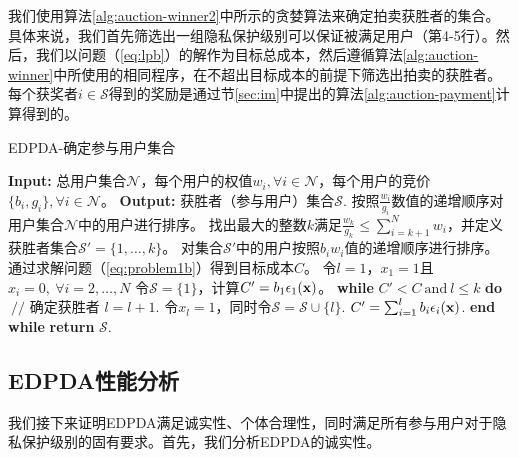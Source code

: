 	我们使用算法\ref{alg:auction-winner2}中所示的贪婪算法来确定拍卖获胜者的集合。具体来说，我们首先筛选出一组隐私保护级别可以保证被满足用户（第4-5行）。然后，我们以问题（\ref{eq:lpb}）的解作为目标总成本，然后遵循算法\ref{alg:auction-winner}中所使用的相同程序，在不超出目标成本的前提下筛选出拍卖的获胜者。每个获奖者$i\in\mathcal{S}$得到的奖励是通过节\ref{sec:im}中提出的算法\ref{alg:auction-payment}计算得到的。
	
	\begin{algorithm}
		\caption{EDPDA-确定参与用户集合}
		\label{alg:auction-winner2}
		\begin{algorithmic}[1]
			\STATE \textbf{Input:} 总用户集合$\mathcal{N}$，每个用户的权值$w_i, \forall i\in\mathcal{N}$，每个用户的竞价$\{b_i, g_i\}, \forall i\in\mathcal{N}$。
			\STATE \textbf{Output:} 获胜者（参与用户）集合$\mathcal{S}$.
			\STATE 按照$\frac{w_i}{g_i}$数值的递增顺序对用户集合$\mathcal{N}$中的用户进行排序。
			\STATE 找出最大的整数$k$满足$\frac{w_{k}}{g_k}\leq\sum_{i=k+1}^Nw_i$，并定义获胜者集合$\mathcal{S}'=\{1,\dots,k\}$。
			\STATE 对集合$\mathcal{S}'$中的用户按照$b_iw_i$值的递增顺序进行排序。
			\STATE 通过求解问题（\ref{eq:problem1b}）得到目标成本$C$。
			\STATE 令$l=1$，$x_1=1$且$x_i=0,~\forall i=2,\dots,N$
			\STATE 令$\mathcal{S}=\{1\}$，计算$C'=b_1\epsilon_1(\mathbf{x})$。
			\STATE \textbf{while} $C'<C~\text{and}~l\leq k$ \textbf{do} $~//$ 确定获胜者
			\STATE \quad $l=l+1$. 
			\STATE \quad 令$x_l=1$，同时令$\mathcal{S}=\mathcal{S}\cup\{l\}$.
			\STATE \quad $C'=\sum_{i=1}^lb_i\epsilon_i(\mathbf{x})$.
			\STATE \textbf{end while}
			\STATE \textbf{return} $\mathcal{S}$.
		\end{algorithmic}
	\end{algorithm}


	\subsection{EDPDA性能分析}\label{sec:analysis2}
	我们接下来证明EDPDA满足诚实性、个体合理性，同时满足所有参与用户对于隐私保护级别的固有要求。首先，我们分析EDPDA的诚实性。
	
